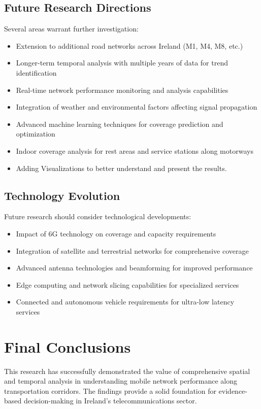 \documentclass[MScCS]{uccthesis}
\begin{document}
\subsection{Future Research Directions}
Several areas warrant further investigation:
\begin{itemize}
\item Extension to additional road networks across Ireland (M1, M4, M8, etc.)
\item Longer-term temporal analysis with multiple years of data for trend identification
\item Real-time network performance monitoring and analysis capabilities
\item Integration of weather and environmental factors affecting signal propagation
\item Advanced machine learning techniques for coverage prediction and optimization
\item Indoor coverage analysis for rest areas and service stations along motorways
\item Adding Visualizations to better understand and present the results.
\end{itemize}

\subsection{Technology Evolution}
Future research should consider technological developments:
\begin{itemize}
\item Impact of 6G technology on coverage and capacity requirements
\item Integration of satellite and terrestrial networks for comprehensive coverage
\item Advanced antenna technologies and beamforming for improved performance
\item Edge computing and network slicing capabilities for specialized services
\item Connected and autonomous vehicle requirements for ultra-low latency services
\end{itemize}

\section{Final Conclusions}

This research has successfully demonstrated the value of comprehensive spatial and temporal analysis in understanding mobile network performance along transportation corridors. The findings provide a solid foundation for evidence-based decision-making in Ireland's telecommunications sector.
\end{document}
